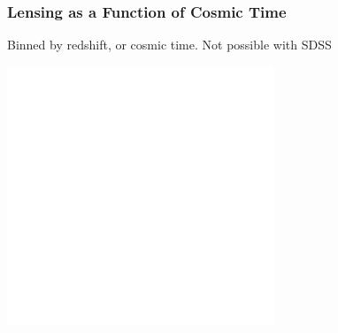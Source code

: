 \documentclass{beamer}
\begin{document}

\frame
{

    \frametitle{Lensing as a Function of Cosmic Time}
 
    \begin{minipage}{\linewidth}
        \vspace{5mm}
        Binned by redshift, or cosmic time.  {\color{gold} Not possible with SDSS }
        \vspace{5mm}
    \end{minipage}
    \begin{minipage}{\linewidth}
        \centering
        \includegraphics[width=0.6\textwidth]{run-rm008-bin-lgt05-zbin4-jack-icolor.pdf}
    \end{minipage}

}
\end{document}
